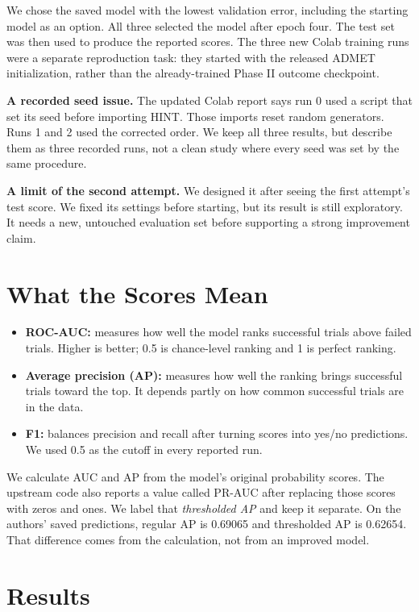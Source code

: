 \documentclass[10pt,letterpaper]{article}
\begin{document}
We chose the saved model with the lowest validation error, including the starting model as an option. All three selected the model after epoch four. The test set was then used to produce the reported scores. The three new Colab training runs were a separate reproduction task: they started with the released ADMET initialization, rather than the already-trained Phase II outcome checkpoint.

\textbf{A recorded seed issue.} The updated Colab report says run 0 used a script that set its seed before importing HINT. Those imports reset random generators. Runs 1 and 2 used the corrected order. We keep all three results, but describe them as three recorded runs, not a clean study where every seed was set by the same procedure.

\textbf{A limit of the second attempt.} We designed it after seeing the first attempt's test score. We fixed its settings before starting, but its result is still exploratory. It needs a new, untouched evaluation set before supporting a strong improvement claim.

\section{What the Scores Mean}
\begin{itemize}
\item \textbf{ROC-AUC:} measures how well the model ranks successful trials above failed trials. Higher is better; 0.5 is chance-level ranking and 1 is perfect ranking.
\item \textbf{Average precision (AP):} measures how well the ranking brings successful trials toward the top. It depends partly on how common successful trials are in the data.
\item \textbf{F1:} balances precision and recall after turning scores into yes/no predictions. We used 0.5 as the cutoff in every reported run.
\end{itemize}

We calculate AUC and AP from the model's original probability scores. The upstream code also reports a value called PR-AUC after replacing those scores with zeros and ones. We label that \emph{thresholded AP} and keep it separate. On the authors' saved predictions, regular AP is 0.69065 and thresholded AP is 0.62654. That difference comes from the calculation, not from an improved model.

\section{Results}
\end{document}
